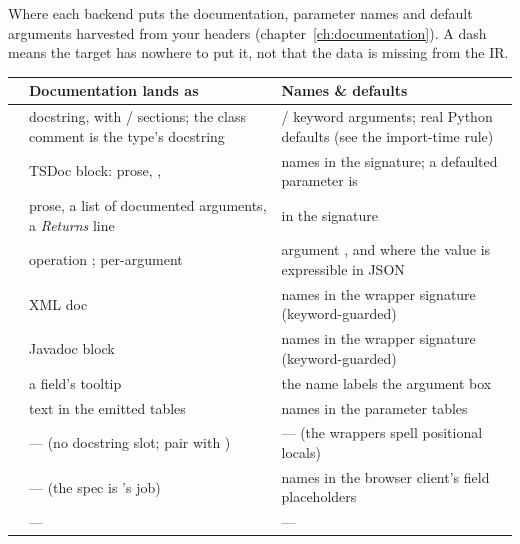 Where each backend puts the documentation, parameter names and default
arguments harvested from your headers (chapter~\ref{ch:documentation}). A dash
means the target has nowhere to put it, not that the data is missing from the
IR.

\begin{center}
\small
\begin{longtable}{@{}lL{5.6cm}L{5.0cm}@{}}
\toprule
\textbf{} & \textbf{Documentation lands as} &
  \textbf{Names \& defaults} \\
\midrule
\endhead
{}  & docstring, with  /
   sections; the class comment is the type's docstring &
   /  keyword arguments; real Python defaults
  (see the import-time rule) \\
\addlinespace
{} & TSDoc block: prose, ,  &
  names in the signature; a defaulted parameter is  \\
\addlinespace
{}  & prose, a list of documented arguments, a
  \emph{Returns} line &  in the signature \\
\addlinespace
{} & operation ; per-argument
   & argument , and  where the
  value is expressible in JSON \\
\addlinespace
{} &  XML doc & names in the wrapper
  signature (keyword-guarded) \\
\addlinespace
{} & Javadoc block & names in the wrapper signature
  (keyword-guarded) \\
\addlinespace
{}   & a field's tooltip & the name labels the
  argument box \\
\addlinespace
{} & text in the emitted  tables & names in the
  parameter tables \\
\addlinespace
{}    & --- (no docstring slot;
  pair with ) & --- (the wrappers spell positional locals) \\
\addlinespace
{} & --- (the spec is 's job) & names in the
  browser client's field placeholders \\
\addlinespace
{}  & --- & --- \\
\bottomrule
\end{longtable}
\end{center}


